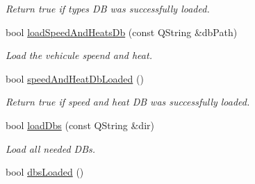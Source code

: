 \begin{DoxyCompactItemize}
\begin{DoxyCompactList}\small\item\em Return true if types DB was successfully loaded. \end{DoxyCompactList}\item 
bool \hyperlink{classmdt_uic_number_ab1d08c2ea34f310631866d2e46010363}{loadSpeedAndHeatsDb} (const QString \&dbPath)
\begin{DoxyCompactList}\small\item\em Load the vehicule speend and heat. \end{DoxyCompactList}\item 
\hypertarget{classmdt_uic_number_a42ec71258e2120337953c8c6bda63638}{
bool \hyperlink{classmdt_uic_number_a42ec71258e2120337953c8c6bda63638}{speedAndHeatDbLoaded} ()}
\label{classmdt_uic_number_a42ec71258e2120337953c8c6bda63638}

\begin{DoxyCompactList}\small\item\em Return true if speed and heat DB was successfully loaded. \end{DoxyCompactList}\item 
bool \hyperlink{classmdt_uic_number_ab7d29b1cb5fe5ac58bef5bec787e83df}{loadDbs} (const QString \&dir)
\begin{DoxyCompactList}\small\item\em Load all needed DBs. \end{DoxyCompactList}\item 
\hypertarget{classmdt_uic_number_ab684e8290b0a74a05e992699bf0fa7f4}{
bool \hyperlink{classmdt_uic_number_ab684e8290b0a74a05e992699bf0fa7f4}{dbsLoaded} ()}
\label{classmdt_uic_number_ab684e8290b0a74a05e992699bf0fa7f4}


\end{DoxyCompactItemize}
